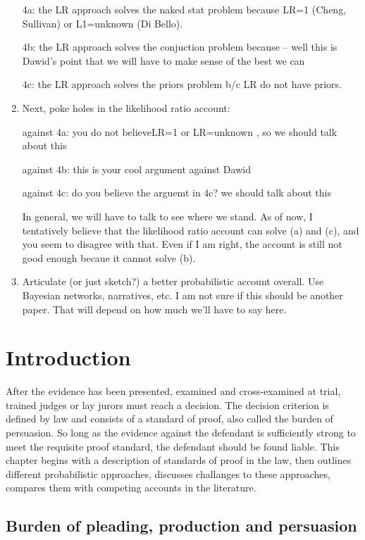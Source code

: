 \documentclass[10pt,dvipsnames,enabledeprecatedfontcommands]{scrartcl}
\begin{document}
\begin{enumerate}
4a: the LR approach solves the naked stat problem because LR=1 (Cheng, Sullivan) or L1=unknown (Di Bello). 

4b: the LR approach solves the conjuction problem because -- well this is Dawid's point that we will have to make sense of the best we can

4c: the LR approach solves the priors problem b/c LR do not have priors.


\item Next, poke holes in the likelihood ratio account:

against 4a: you do not believeLR=1 or LR=unknown , so we should  talk about this

against 4b: this is your cool argument against Dawid

against 4c: do you believe the arguemt in 4c? we should talk about this 

In general, we will have to talk to see where we stand. As of now, I tentatively believe that the likelihood ratio account can solve (a) and (c), and you seem to disagree with that. Even if I am right, the account is still not good enough becaue it cannot solve (b).

\item Articulate (or just sketch?) a better probabilistic account overall. 
Use Bayesian networks, narratives, etc. I am not sure if this 
should be another paper. That will depend on how much we'll 
have to say here. 


\end{enumerate}

\section{Introduction}\label{introduction}

After the evidence has been presented, examined and cross-examined at
trial, trained judges or lay jurors must reach a decision. The decision
criterion is defined by law and consists of a standard of proof, also
called the burden of persuasion. So long as the evidence against the
defendant is sufficiently strong to meet the requisite proof standard,
the defendant should be found liable. This chapter begins with a
description of standards of proof in the law, then outlines different
probabilistic approaches, discusses challanges to these approaches,
compares them with competing accounts in the literature.

\subsection{Burden of pleading, production and
persuasion}\label{burden-of-pleading-production-and-persuasion}
\end{document}
